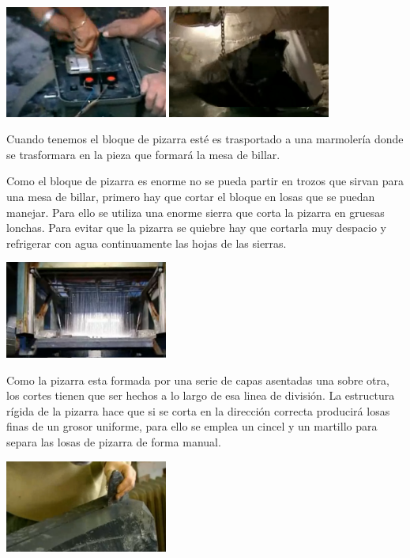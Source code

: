 	\begin{center}
	    		\includegraphics[width=0.4\textwidth]{Pantallazo-1.png}
			\includegraphics[width=0.4\textwidth]{Pantallazo-2.png}
	\end{center}

 Cuando tenemos el bloque de pizarra esté es trasportado a una marmolería donde se trasformara en la pieza que formará la mesa de billar.


Como el bloque de pizarra es enorme  no se pueda partir  en trozos que sirvan para una mesa de billar, primero hay que cortar el bloque en losas que se puedan manejar. Para ello se utiliza una enorme sierra que corta la pizarra en gruesas lonchas. Para evitar que la pizarra se quiebre hay que cortarla muy despacio y refrigerar con agua continuamente las hojas de las sierras. 
	\begin{center}
	    		\includegraphics[width=0.4\textwidth]{Pantallazo-3.png}

	\end{center}


Como la pizarra esta formada por una serie de capas asentadas una sobre otra, los cortes tienen que ser hechos  a lo largo de esa linea de división.  La estructura rígida    
de la pizarra hace que si se corta en la dirección correcta producirá losas finas de un grosor uniforme, para ello se emplea un cincel y un martillo para separa las losas de pizarra de forma manual.
	\begin{center}
	    		\includegraphics[width=0.4\textwidth]{Pantallazo-5.png}

	\end{center}

